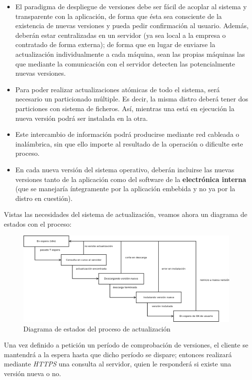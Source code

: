 \begin{itemize}
	\item El paradigma de despliegue de versiones debe ser fácil de acoplar al sistema y transparente con la aplicación, de forma que ésta sea consciente de la existencia de nuevas versiones y pueda pedir confirmación al usuario. Además, deberán estar centralizadas en un servidor (ya sea local a la empresa o contratado de forma externa); de forma que en lugar de enviarse la actualización individualmente a cada máquina, sean las propias máquinas las que mediante la comunicación con el servidor detecten las potencialmente nuevas versiones.
	\item Para poder realizar actualizaciones atómicas de todo el sistema, será necesario un particionado múltiple. Es decir, la misma distro deberá tener dos particiones con sistema de ficheros. Así, mientras una está en ejecución la nueva versión podrá ser instalada en la otra.
	\item Este intercambio de información podrá producirse mediante red cableada o inalámbrica, sin que ello importe al resultado de la operación o dificulte este proceso.
	\item En cada nueva versión del sistema operativo, deberán incluirse las nuevas versiones tanto de la aplicación como del software de la \textbf{electrónica interna} (que se manejaría íntegramente por la aplicación embebida y no ya por la distro en cuestión).
\end{itemize}

Vistas las necesidades del sistema de actualización, veamos ahora un diagrama de estados con el proceso:

\begin{figure}[H]
	\centering
	\includegraphics[width=\linewidth]{imagenes/statechart-actualizacion.png}
	\caption{Diagrama de estados del proceso de actualización}
	\label{statechart-actualizacion}
\end{figure}

Una vez definido a petición un período de comprobación de versiones, el cliente se mantendrá a la espera hasta que dicho período se dispare; entonces realizará mediante \textit{HTTPS} una consulta al servidor, quien le responderá si existe una versión nueva o no.\\

